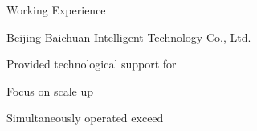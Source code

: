 \begin{rubric}{Working Experience}

  \listitem{} Beijing Baichuan Intelligent Technology Co., Ltd.

  \listitem{} Provided  technological support for

  \listitem{} Focus on scale up 

  \listitem{} Simultaneously operated exceed 
\end{rubric}
